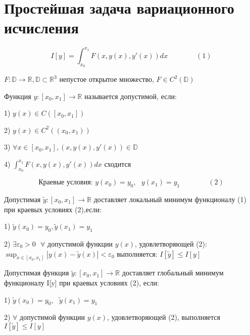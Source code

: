 \documentclass[12pt, a4paper]{report}
\begin{document}
\section{Простейшая задача вариационного исчисления}

\[ I[y]= \int_{x_0}^{x_1} F ( x, y(x),y'(x))dx \quad \quad \quad \quad (1)  \] 

\( F : \mathbb{D} \to \mathbb{R}, \mathbb{D} \subset \mathbb{R} ^3   \) непустое открытое множество, \( F \in  C ^2 (\mathbb{D}) \) 

\begin{definition}   
    Функция \( y : [x_0,x_1]\to \mathbb{R}  \) называется допустимой, если: 
    
    1) \(\displaystyle  y(x)\in  C([x_0,x_1]) \)
    
    2) \(\displaystyle  y(x) \in  C ^2 ((x_0,x_1)) \)
    
    3) \( \displaystyle \forall x \in  [x_0,x_1 ] , ( x, y(x), y ' (x)) \in  \mathbb{D}  \)
    
    4) \( \displaystyle \int_{x_0 }^{x_1} F(x,y(x),y' (x))dx \)  сходится

\end{definition}



\[ \text{Краевые условия: } y(x_0)=y_0,\text{ }  y(x_1)=y_1 \quad \quad \quad \quad (2) \] 

\begin{definition}
    Допустимая \( \tilde{y}:[x_0,x_1] \to  \mathbb{R}  \) доставляет локальный минимум функционалу (1) при краевых условиях (2),если: 

    1) \( \tilde{y}(x_0)=y_0, \tilde{y}(x_1)= y_1   \) 

    2) \( \exists \varepsilon_0 >0 \text{ }  \forall   \) допустимой функции \( y(x) \), удовлетворяющей (2): \( \sup _{x \in  [x_0,x_1]}|y(x)-\tilde{y}(x) |< \varepsilon_0  \) выполняется: \( I[\tilde{y}] \le I[y] \) 
\end{definition}

\begin{definition}
    Допустимая функция \( \tilde{y} : [x_0,x_1] \to  \mathbb{R} \)  доставляет глобальный минимум функционалу I[y] при краевых условиях (2), если: 

    1) \( \tilde{y} (x_0)=y_0, \text{ } \tilde{y} (x_1) =y_1 \)
    
    2) \( \forall \) допустимой функции \( y(x) \), удовлетворяющей (2), выполняется \( I[\tilde{y} ] \le I [y] \) 
\end{definition}
\end{document}
